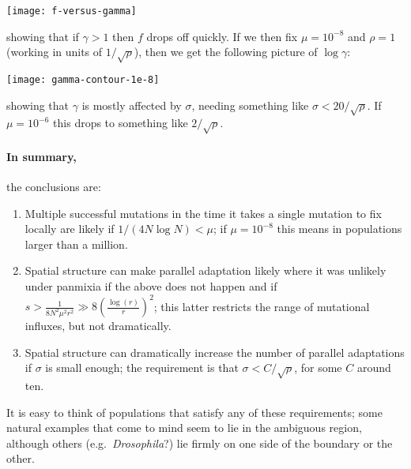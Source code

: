 \documentclass{article}
\begin{document}
\texttt{[image: f-versus-gamma]}

showing that if $\gamma>1$ then $f$ drops off quickly.
If we then fix $\mu=10^{-8}$ and $\rho=1$ (working in units of $1/\sqrt{\rho}$), 
then we get the following picture of $\log \gamma$:

\texttt{[image: gamma-contour-1e-8]}

showing that $\gamma$ is mostly affected by $\sigma$,
needing something like $\sigma<20/\sqrt{\rho}$.
If $\mu=10^{-6}$ this drops to something like $2/\sqrt{\rho}$.

\paragraph{In summary,}
the conclusions are:
\begin{enumerate}

  \item Multiple successful mutations in the time it takes a single mutation to fix locally
    are likely if $1/(4 N \log N) < \mu$; if $\mu=10^{-8}$ this means in populations larger than a million.

  \item Spatial structure can make parallel adaptation likely where it was unlikely under panmixia
    if the above does not happen and if
    $s > \frac{1}{8 N^2 \mu^2 r^2} \gg 8 \left(\frac{ \log(r) }{ r }\right)^2$;
    this latter restricts the range of mutational influxes, but not dramatically.

  \item Spatial structure can dramatically increase the number of parallel adaptations if $\sigma$ is small enough;
    the requirement is that $\sigma<C/\sqrt{\rho}$, for some $C$ around ten.

\end{enumerate}

It is easy to think of populations that satisfy any of these requirements;
some natural examples that come to mind seem to lie in the ambiguous region,
although others (e.g.\ {\it Drosophila}?) lie firmly on one side of the boundary or the other.
\end{document}
